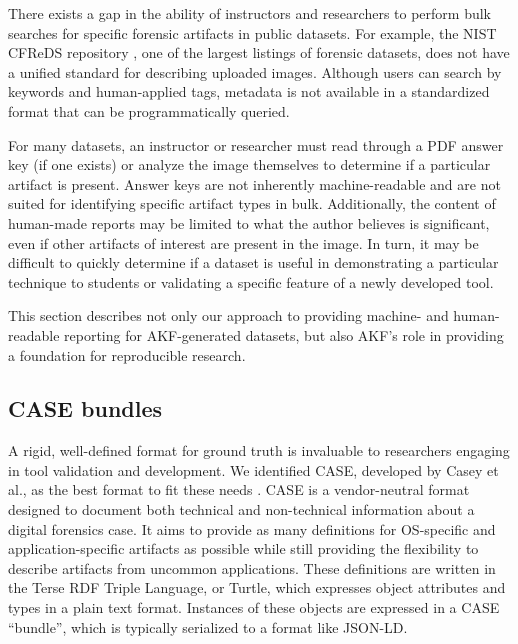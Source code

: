 There exists a gap in the ability of instructors and researchers to
perform bulk searches for specific forensic artifacts in public
datasets. For example, the NIST CFReDS repository
\cite{nationalinstituteofstandardsandtechnologyCFReDSPortal}, one of
the largest listings of forensic datasets, does not have a unified
standard for describing uploaded images. Although users can search by
keywords and human-applied tags, metadata is not available in a
standardized format that can be programmatically queried.

For many datasets, an instructor or researcher must read through a PDF
answer key (if one exists) or analyze the image themselves to determine
if a particular artifact is present. Answer keys are not inherently
machine-readable and are not suited for identifying specific artifact
types in bulk. Additionally, the content of human-made reports may be
limited to what the author believes is significant, even if other
artifacts of interest are present in the image. In turn, it may be
difficult to quickly determine if a dataset is useful in demonstrating a
particular technique to students or validating a specific feature of a
newly developed tool.

This section describes not only our approach to providing machine- and
human-readable reporting for AKF-generated datasets, but also AKF's role
in providing a foundation for reproducible research.

\subsection{CASE bundles}\label{case-bundles}

A rigid, well-defined format for ground truth is invaluable to
researchers engaging in tool validation and development. We identified
CASE, developed by Casey et al., as the best format to fit these needs
\cite{caseyAdvancingCoordinatedCyberinvestigations2017}. CASE is a
vendor-neutral format designed to document both technical and
non-technical information about a digital forensics case. It aims to
provide as many definitions for OS-specific and application-specific
artifacts as possible while still providing the flexibility to describe
artifacts from uncommon applications. These definitions are written in
the Terse RDF Triple Language, or Turtle, which expresses object
attributes and types in a plain text format. Instances of these objects
are expressed in a CASE ``bundle'', which is typically serialized to a
format like JSON-LD.

